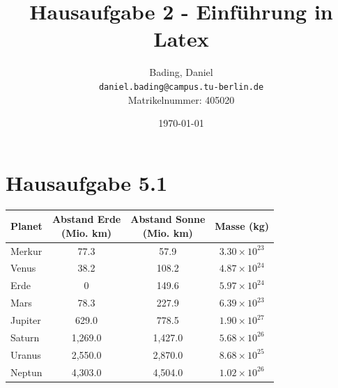 \documentclass{scrartcl}
\title{Hausaufgabe 2 - Einführung in Latex}
\author{
  Bading, Daniel\\
  \texttt{daniel.bading@campus.tu-berlin.de}\\
  Matrikelnummer: 405020
  }
\date{\today}
\begin{document}
\maketitle

\newpage

\tableofcontents

\newpage


\section{Hausaufgabe 5.1}

\begin{table}[h]
\label{tab:planeteninfos}
\centering
\begin{tabular}{| l | c | c | c | }
\hline
\textbf{Planet} & \thead{Abstand Erde \\ (Mio. km)} & \thead{Abstand Sonne \\ (Mio. km)} & \textbf{Masse (kg)} \\ 
\hline
Merkur & 77.3 & 57.9 & \(3.30 \times 10^{23}\) \\
Venus & 38.2 & 108.2 & \(4.87 \times 10^{24}\) \\
Erde & 0 & 149.6 & \(5.97 \times 10^{24}\) \\
Mars & 78.3 & 227.9 & \(6.39 \times 10^{23}\) \\
Jupiter & 629.0 & 778.5 & \(1.90 \times 10^{27}\) \\
Saturn & 1,269.0 & 1,427.0 & \(5.68 \times 10^{26}\) \\
Uranus & 2,550.0 & 2,870.0 & \(8.68 \times 10^{25}\) \\
Neptun & 4,303.0 & 4,504.0 & \(1.02 \times 10^{26}\) \\
\hline
\end{tabular}
\end{table}
\end{document}

